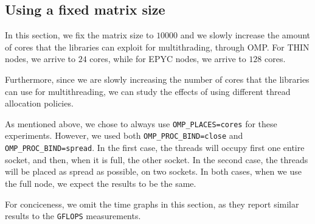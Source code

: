 \documentclass{report}
\begin{document}
\subsection{Using a fixed matrix size}

In this section, we fix the matrix size to $10000$ and we slowly increase the 
amount of cores that the libraries can exploit for multithrading, through OMP. 
For THIN nodes, we arrive to $24$ cores, while for EPYC nodes, we arrive to $128$ 
cores.

Furthermore, since we are slowly increasing the number of cores that the libraries 
can use for multithreading, we can study the effects of using different 
thread allocation policies.

As mentioned above, we chose to always use \texttt{OMP\_PLACES=cores} for these 
experiments. However, we used both \texttt{OMP\_PROC\_BIND=close} and 
\texttt{OMP\_PROC\_BIND=spread}. In the first case, the threads will occupy first 
one entire socket, and then, when it is full, the other socket. In the second case, 
the threads will be placed as spread as possible, on two sockets. 
In both cases, when we use the full node, we expect the results to be the same.

For conciceness, we omit the time graphs in this 
section, as they report similar results to the \texttt{GFLOPS} measurements. 
\end{document}

